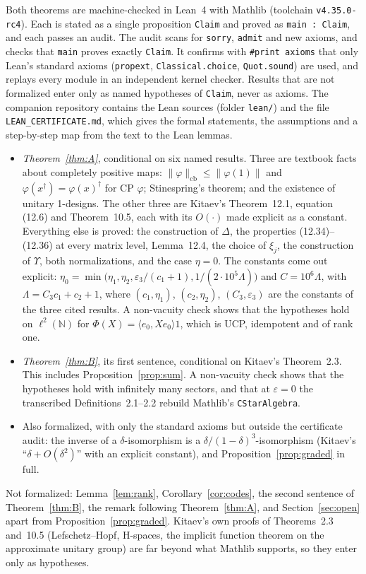 \documentclass[11pt]{article}
\theoremstyle{remark}
\newcommand{\eps}{\varepsilon}
\newcommand{\cb}{\mathrm{cb}}
\begin{document}
Both theorems are machine-checked in Lean~4 with Mathlib (toolchain \texttt{v4.35.0-rc4}). Each is stated as a single proposition \texttt{Claim} and proved as \texttt{main : Claim}, and each passes an audit. The audit scans for \texttt{sorry}, \texttt{admit} and new axioms, and checks that \texttt{main} proves exactly \texttt{Claim}. It confirms with \texttt{\#print axioms} that only Lean's standard axioms (\texttt{propext}, \texttt{Classical.choice}, \texttt{Quot.sound}) are used, and replays every module in an independent kernel checker. Results that are not formalized enter only as named hypotheses of \texttt{Claim}, never as axioms. The companion repository contains the Lean sources (folder \texttt{lean/}) and the file \texttt{LEAN\_CERTIFICATE.md}, which gives the formal statements, the assumptions and a step-by-step map from the text to the Lean lemmas.
\begin{itemize}
\item \emph{Theorem~\ref{thm:A}}, conditional on six named results. Three are textbook facts about completely positive maps: $\|\varphi\|_\cb\le\|\varphi(1)\|$ and $\varphi(x^\dagger)=\varphi(x)^\dagger$ for CP $\varphi$; Stinespring's theorem; and the existence of unitary 1-designs. The other three are Kitaev's Theorem~12.1, equation (12.6) and Theorem~10.5, each with its $O(\cdot)$ made explicit as a constant. Everything else is proved: the construction of $\Delta$, the properties (12.34)--(12.36) at every matrix level, Lemma~12.4, the choice of $\xi_j$, the construction of $\Upsilon$, both normalizations, and the case $\eta=0$. The constants come out explicit: $\eta_0=\min\bigl(\eta_1,\eta_2,\eps_3/(c_1+1),1/(2\cdot10^5\Lambda)\bigr)$ and $C=10^6\Lambda$, with $\Lambda=C_3c_1+c_2+1$, where $(c_1,\eta_1)$, $(c_2,\eta_2)$, $(C_3,\eps_3)$ are the constants of the three cited results. A non-vacuity check shows that the hypotheses hold on $\ell^2(\mathbb{N})$ for $\Phi(X)=\langle e_0,Xe_0\rangle1$, which is UCP, idempotent and of rank one.
\item \emph{Theorem~\ref{thm:B}}, its first sentence, conditional on Kitaev's Theorem~2.3. This includes Proposition~\ref{prop:sum}. A non-vacuity check shows that the hypotheses hold with infinitely many sectors, and that at $\eps=0$ the transcribed Definitions~2.1--2.2 rebuild Mathlib's \texttt{CStarAlgebra}.
\item Also formalized, with only the standard axioms but outside the certificate audit: the inverse of a $\delta$-isomorphism is a $\delta/(1-\delta)^3$-isomorphism (Kitaev's ``$\delta+O(\delta^2)$'' with an explicit constant), and Proposition~\ref{prop:graded} in full.
\end{itemize}
Not formalized: Lemma~\ref{lem:rank}, Corollary~\ref{cor:codes}, the second sentence of Theorem~\ref{thm:B}, the remark following Theorem~\ref{thm:A}, and Section~\ref{sec:open} apart from Proposition~\ref{prop:graded}. Kitaev's own proofs of Theorems~2.3 and~10.5 (Lefschetz--Hopf, H-spaces, the implicit function theorem on the approximate unitary group) are far beyond what Mathlib supports, so they enter only as hypotheses.
\end{document}
